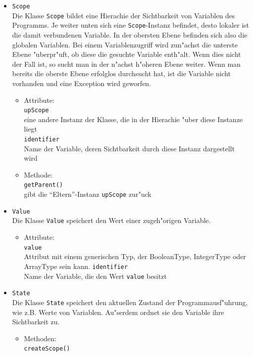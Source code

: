 \documentclass[10pt,a4paper,titlepage]{article}
\begin{document}
\begin{itemize}
\item \texttt{Scope} \\
Die Klasse \texttt{Scope} bildet eine Hierachie der Sichtbarkeit von Variablen des Programms. Je weiter unten sich eine \texttt{Scope}-Instanz befindet, desto lokaler ist die damit verbundenen Variable. In der obersten Ebene befinden sich also die globalen Variablen. Bei einem Variablenzugriff wird zun"achst die unterste Ebene "uberpr"uft, ob diese die gesuchte Variable enth"alt. Wenn dies nicht der Fall ist, so sucht man in der n"achst h"oheren Ebene weiter. Wenn man bereits die oberste Ebene erfolglos durchsucht hat, ist die Variable nicht vorhanden und eine Exception wird geworfen. 
\begin{itemize}
\item Attribute: \\
\texttt{upScope} \\
eine andere Instanz der Klasse, die in der Hierachie "uber diese Instanze liegt \\
\texttt{identifier} \\
Name der Variable, deren Sichtbarkeit durch diese Instanz dargestellt wird
\item Methode: \\
\texttt{getParent()} \\
gibt die "`Eltern"'-Instanz \texttt{upScope} zur"uck
\end{itemize}
\item \texttt{Value} \\
Die Klasse \texttt{Value} speichert den Wert einer zugeh"origen Variable. 
\begin{itemize}
\item Attribute: \\
\texttt{value} \\
Attribut mit einem generischen Typ, der BooleanType, IntegerType oder ArrayType sein kann. 
\texttt{identifier} \\
Name der Variable, die den Wert \texttt{value} besitzt
\end{itemize}
\item \texttt{State} \\
Die Klasse \texttt{State} speichert den aktuellen Zustand der Programmausf"uhrung, wie z.B. Werte von Variablen. Au"serdem ordnet sie den Variable ihre Sichtbarkeit zu.
\begin{itemize}
\item Methoden: \\
\texttt{createScope()} \\

\end{itemize}
\end{itemize}
\end{document}
